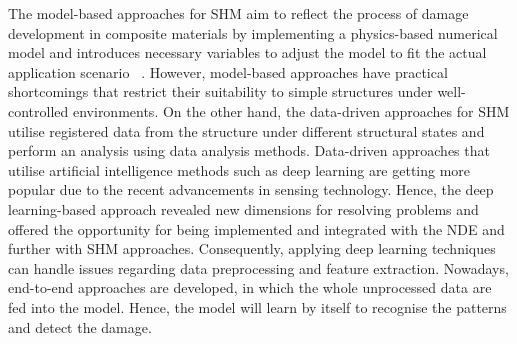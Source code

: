 The model-based approaches for SHM aim to reflect the process of damage development in composite materials by implementing a physics-based numerical model and introduces necessary variables to adjust the model to fit the actual application scenario ~\cite{Wu2021}. 
However, model-based approaches have practical shortcomings that restrict their suitability to simple structures under well-controlled environments.
%
%
On the other hand, the data-driven approaches for SHM utilise registered data from the structure under different structural states and perform an analysis using data analysis methods.
Data-driven approaches that utilise artificial intelligence methods such as deep learning are getting more popular due to the recent advancements in sensing technology.
Hence, the deep learning-based approach revealed new dimensions for resolving problems and offered the opportunity for being implemented and integrated with the NDE and further with SHM approaches. Consequently, applying deep learning techniques can handle issues regarding data preprocessing and feature extraction.
Nowadays, end-to-end approaches are developed, in which the whole unprocessed data are fed into the model.
Hence, the model will learn by itself to recognise the patterns and detect the damage.
%

